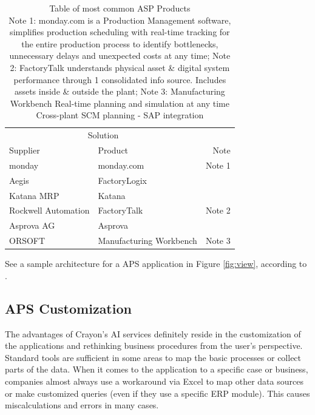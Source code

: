 \documentclass[fleqn,10pt]{SelfArx} %
\begin{document}
\begin{table}[hbt]
\caption{Table of most common ASP Products\\
\scriptsize{Note 1: monday.com is a Production Management software, simplifies production scheduling with real-time tracking for the entire production process to identify bottlenecks, unnecessary delays and unexpected costs at any time; Note 2: FactoryTalk understands physical asset \& digital system performance through 1 consolidated info source. Includes assets inside \& outside the plant; Note 3: Manufacturing Workbench Real-time planning and simulation at any time Cross-plant SCM planning - SAP integration}}
\centering
\begin{tabular}{llr}
\toprule
\multicolumn{2}{c}{Solution} \\
\cmidrule(r){1-2}
Supplier & Product & Note \\
\midrule
monday    & monday.com & Note 1 \\
Aegis & FactoryLogix \\
Katana MRP & Katana \\
Rockwell Automation & FactoryTalk & Note 2 \\
Asprova AG                              & Asprova  \\
ORSOFT         & Manufacturing Workbench  & Note 3\\
\bottomrule
\end{tabular}
\label{suppliers}
\end{table}

See a sample architecture for a APS application in Figure \ref{fig:view}, according to \cite{vidoni2015}.


\subsection{APS Customization}
The advantages of Crayon's AI services definitely reside in the customization of the applications and rethinking business procedures from the user’s perspective. Standard tools are sufficient in some areas to map the basic processes or collect parts of the data. When it comes to the application to a specific case or business, companies almost always use a workaround via Excel to map other data sources or make customized queries (even if they use a specific ERP module). This causes miscalculations and errors in many cases.
\end{document}
